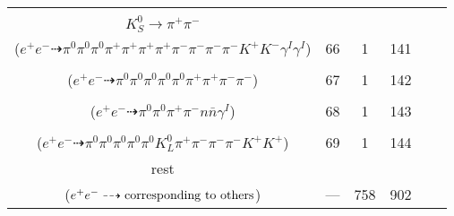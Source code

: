 \documentclass[landscape]{article}
\newcounter{rownumbers}
\newcommand\rn{\stepcounter{rownumbers}\arabic{rownumbers}}
\newcommand{\EOL}{\\} %
\newcommand{\topoTags}[1]{#1} %
\begin{document}
\begin{longtable}{clcccc}
\rn & \makecell[l]{ $ 
e^{+} e^{-} \rightarrow \pi^{0} \pi^{0} \pi^{+} \omega K^{0} K^{+} K^{-} K^{*-} \gamma^{I} \gamma^{I} ,
\omega \rightarrow \pi^{0} \pi^{+} \pi^{-} ,
K^{0} \rightarrow K_{S}^{0} ,
K^{*-} \rightarrow \pi^{-} \bar{K}^{0} ,
K_{S}^{0} \rightarrow \pi^{+} \pi^{-} ,
\bar{K}^{0} \rightarrow K_{S}^{0} ,
$ \\ $
K_{S}^{0} \rightarrow \pi^{+} \pi^{-} 
$ \\ ($
e^{+} e^{-} \dashrightarrow \pi^{0} \pi^{0} \pi^{0} \pi^{+} \pi^{+} \pi^{+} \pi^{+} \pi^{-} \pi^{-} \pi^{-} \pi^{-} K^{+} K^{-} \gamma^{I} \gamma^{I} 
$) } & \topoTags{66 & }1 & 141 \EOL

\rn & \makecell[l]{ $ 
e^{+} e^{-} \rightarrow \pi^{0} \pi^{0} \pi^{0} \pi^{0} \pi^{+} \pi^{+} \pi^{-} \rho^{-} ,
\rho^{-} \rightarrow \pi^{0} \pi^{-} 
$ \\ ($
e^{+} e^{-} \dashrightarrow \pi^{0} \pi^{0} \pi^{0} \pi^{0} \pi^{0} \pi^{+} \pi^{+} \pi^{-} \pi^{-} 
$) } & \topoTags{67 & }1 & 142 \EOL

\rn & \makecell[l]{ $ 
e^{+} e^{-} \rightarrow \pi^{0} \omega n \bar{n} \gamma^{I} ,
\omega \rightarrow \pi^{0} \pi^{+} \pi^{-} 
$ \\ ($
e^{+} e^{-} \dashrightarrow \pi^{0} \pi^{0} \pi^{+} \pi^{-} n \bar{n} \gamma^{I} 
$) } & \topoTags{68 & }1 & 143 \EOL

\rn & \makecell[l]{ $ 
e^{+} e^{-} \rightarrow \pi^{0} \pi^{0} \pi^{0} \pi^{0} \pi^{-} \bar{K}^{0} \bar{K}^{0} K^{*} K^{*+} ,
\bar{K}^{0} \rightarrow K_{L}^{0} ,
\bar{K}^{0} \rightarrow K_{S}^{0} ,
K^{*} \rightarrow \pi^{-} K^{+} ,
K^{*+} \rightarrow \pi^{0} K^{+} ,
K_{S}^{0} \rightarrow \pi^{+} \pi^{-} 
$ \\ ($
e^{+} e^{-} \dashrightarrow \pi^{0} \pi^{0} \pi^{0} \pi^{0} \pi^{0} K_{L}^{0} \pi^{+} \pi^{-} \pi^{-} \pi^{-} K^{+} K^{+} 
$) } & \topoTags{69 & }1 & 144 \EOL

rest & \makecell[l]{ $ 
e^{+} e^{-} \rightarrow \rm{others \  (758 \  in \  total)}
$ \\ ($
e^{+} e^{-} \dashrightarrow \rm{corresponding\ to\ others}
$) } & \topoTags{--- & }758 & 902 \\ \hline

\end{longtable}
\end{document}
